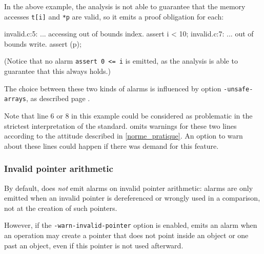 \documentclass{frama-c-book}
\begin{document}
In the above example, the analysis is not able to guarantee that
the memory accesses \lstinline|t[i]| and \lstinline|*p| are valid,
so it emits a proof obligation for each:
\begin{logs}
invalid.c:5: ... accessing out of bounds index. assert i < 10;
invalid.c:7: ... out of bounds write. assert \valid(p);
\end{logs}
(Notice that no alarm \lstinline|assert 0 <= i| is emitted, as the
analysis is able to guarantee that this always holds.)


The choice between these two kinds of alarms is influenced by
option \lstinline|-unsafe-arrays|, as described
page \pageref{unsafe-arrays}.

Note that line 6 or 8 in this example could be considered as
problematic in the strictest interpretation of the standard.
\Eva{} omits warnings for these two lines according
to the attitude described in \ref{norme_pratique}. An option
to warn about these lines could happen if there was demand for
this feature.

\subsubsection{Invalid pointer arithmetic}

By default, \Eva{} does \emph{not} emit alarms on invalid pointer arithmetic:
alarms are only emitted when an invalid pointer is dereferenced or wrongly used
in a comparison, not at the creation of such pointers.

However, if the \lstinline|-warn-invalid-pointer| option is enabled,
\Eva{} emits an alarm when an operation may create a pointer that does
not point inside an object or one past an object,
even if this pointer is not used afterward.
\end{document}
